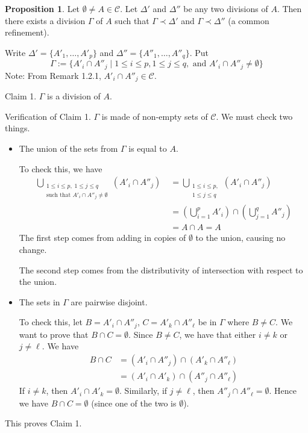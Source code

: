 \documentclass[11pt]{article}
\makeatletter
\theoremstyle{definition}
\newtheorem{prop}[thm]{Proposition}
\newenvironment{pf}[1][\proofname]{\par
  \pushQED{\qed}%
  \normalfont \topsep0\p@\relax
  \trivlist
  \item[\hskip\labelsep\itshape
  #1\@addpunct{.}]\ignorespaces
}{%
  \popQED\endtrivlist\@endpefalse
}
\makeatother
\begin{document}
\begin{prop}
Let $\emptyset \ne A \in \mathcal{C}$. Let $\Delta'$ and $\Delta''$ be any two divisions of $A$. Then there exists a division $\Gamma$ of $A$ such that $\Gamma \prec \Delta'$ and $\Gamma \prec \Delta''$ (a common refinement).
\end{prop}
\begin{pf}
Write $\Delta' = \{A'_1, \dots, A'_p\}$ and $\Delta'' = \{A''_1, \dots, A''_q\}$. Put
$$\Gamma := \{A'_i \cap A''_j \mid 1 \leq i \leq p, 1 \leq j \leq q, \text{ and } A'_i \cap A''_j \ne \emptyset\}$$
Note: From Remark 1.2.1, $A'_i \cap A''_j \in \mathcal{C}$.

{\sc Claim 1.} $\Gamma$ is a division of $A$.

{\sc Verification of Claim 1.} $\Gamma$ is made of non-empty sets of $\mathcal{C}$. We must check two things. \vspace{-1.5ex}
\begin{itemize}
    \item The union of the sets from $\Gamma$ is equal to $A$.
    
    To check this, we have
    \begin{align*}
        \bigcup_{\substack{1 \leq i \leq p, \; 1 \leq j \leq q  \\ \text{such that } A'_i \cap A''_j \ne \emptyset}} (A'_i \cap A''_j) \;
        &= \bigcup_{\substack{1 \leq i \leq p, \\ 1 \leq j \leq q}} (A'_i \cap A''_j) \\
        &= \left( \bigcup_{i=1}^p A'_i \right) \cap \left( \bigcup_{j=1}^q A''_j \right) \\
        &= A \cap A = A
    \end{align*}
    The first step comes from adding in copies of $\emptyset$ to the union, causing no change. 
    
    The second step comes from the distributivity of intersection with respect to the union.
    
    \item The sets in $\Gamma$ are pairwise disjoint.
    
    To check this, let $B = A'_i \cap A''_j$, $C = A'_k \cap A''_\ell$ be in $\Gamma$ where $B \ne C$. We want to prove that $B \cap C = \emptyset$. Since $B \ne C$, we have that either $i \ne k$ or $j \ne \ell$. We have
    \begin{align*}
        B \cap C 
        &= (A'_i \cap A''_j) \cap (A'_k \cap A''_\ell) \\
        &= (A'_i \cap A'_k) \cap (A''_j \cap A''_\ell)
    \end{align*}
    If $i \ne k$, then $A'_i \cap A'_k = \emptyset$. Similarly, if $j \ne \ell$, then $A''_j \cap A''_\ell = \emptyset$. Hence we have $B \cap C = \emptyset$ (since one of the two is $\emptyset$).
\end{itemize}
\vspace{-1.5ex}
This proves Claim 1.


\end{pf}
\end{document}
